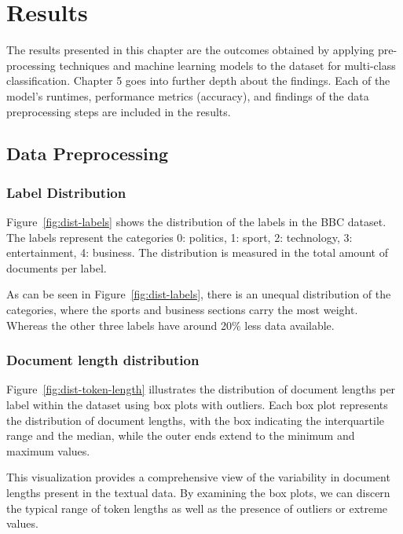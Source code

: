 \chapter{Results}

The results presented in this chapter are the outcomes obtained by applying pre-processing techniques and machine learning models to the dataset for multi-class classification. Chapter 5 goes into further depth about the findings. Each of the model’s runtimes, performance metrics (accuracy), and findings of the data preprocessing steps are included in the results. 

\section{Data Preprocessing}
\subsection{Label Distribution}


Figure~\ref{fig:dist-labels} shows the distribution of the labels in the BBC dataset. The labels represent the categories 0: politics, 1: sport, 2: technology, 3: entertainment, 4: business. The distribution is measured in the total amount of documents per label.

As can be seen in Figure~\ref{fig:dist-labels}, there is an unequal distribution of the categories, where the sports and business sections carry the most weight. Whereas the other three labels have around 20\% less data available.

\subsection{Document length distribution}


Figure~\ref{fig:dist-token-length} illustrates the distribution of document lengths per label within the dataset using box plots with outliers. Each box plot represents the distribution of document lengths, with the box indicating the interquartile range and the median, while the outer ends extend to the minimum and maximum values.

This visualization provides a comprehensive view of the variability in document lengths present in the textual data. By examining the box plots, we can discern the typical range of token lengths as well as the presence of outliers or extreme values.

